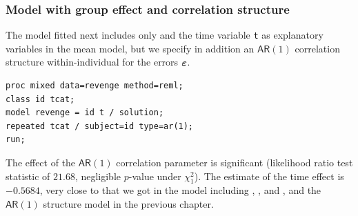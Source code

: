 \documentclass{beamer}
\begin{document}
% 

% 

\begin{frame}[fragile]
\frametitle{Model with group effect and correlation structure}
The model fitted next includes only  and the time variable \texttt{t} as explanatory variables in the mean model, but we specify in addition an $\mathsf{AR}(1)$ correlation structure within-individual for the errors $\boldsymbol {\varepsilon}$.

\begin{tcolorbox}[colback=white, colframe=hecblue, title=\SASlang{} code to include a group effect with $\mathsf{AR}(1)$ correlation]
\begin{verbatim}
proc mixed data=revenge method=reml; 
class id tcat; 
model revenge = id t / solution; 
repeated tcat / subject=id type=ar(1); 
run;
\end{verbatim}
\end{tcolorbox}
{\footnotesize  The effect of the $\mathsf{AR}(1)$ correlation parameter is significant (likelihood ratio test statistic of $21.68$, negligible $p$-value under $\chi^2_1$). The estimate of the time effect is $-0.5684$, very close to that we got in the model including , ,  and , and the  $\mathsf{AR}(1)$ structure model in the previous chapter. 

}
\end{frame}
% 
\end{document}
